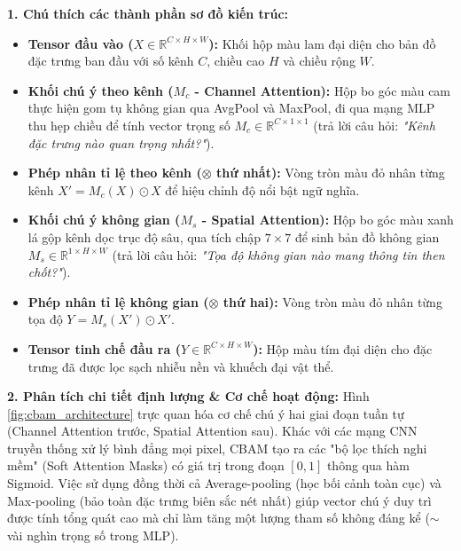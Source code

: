 \documentclass[12pt,a4paper]{article}
\begin{document}
\begin{chartbox}[title={Chú thích \& Phân tích chuyên sâu Sơ đồ khối chú ý CBAM (Hình \ref{fig:cbam_architecture})}]
\textbf{\color{blue!80!black}1. Chú thích các thành phần sơ đồ kiến trúc:}
\begin{itemize}[noitemsep,topsep=1pt,leftmargin=15pt]
    \item \textbf{Tensor đầu vào ($X \in \mathbb{R}^{C \times H \times W}$):} Khối hộp màu lam đại diện cho bản đồ đặc trưng ban đầu với số kênh $C$, chiều cao $H$ và chiều rộng $W$.
    \item \textbf{Khối chú ý theo kênh ($M_c$ - Channel Attention):} Hộp bo góc màu cam thực hiện gom tụ không gian qua AvgPool và MaxPool, đi qua mạng MLP thu hẹp chiều để tính vector trọng số $M_c \in \mathbb{R}^{C \times 1 \times 1}$ (trả lời câu hỏi: \textit{"Kênh đặc trưng nào quan trọng nhất?"}).
    \item \textbf{Phép nhân tỉ lệ theo kênh ($\otimes$ thứ nhất):} Vòng tròn màu đỏ nhân từng kênh $X' = M_c(X) \odot X$ để hiệu chỉnh độ nổi bật ngữ nghĩa.
    \item \textbf{Khối chú ý không gian ($M_s$ - Spatial Attention):} Hộp bo góc màu xanh lá gộp kênh dọc trục độ sâu, qua tích chập $7 \times 7$ để sinh bản đồ không gian $M_s \in \mathbb{R}^{1 \times H \times W}$ (trả lời câu hỏi: \textit{"Tọa độ không gian nào mang thông tin then chốt?"}).
    \item \textbf{Phép nhân tỉ lệ không gian ($\otimes$ thứ hai):} Vòng tròn màu đỏ nhân từng tọa độ $Y = M_s(X') \odot X'$.
    \item \textbf{Tensor tinh chế đầu ra ($Y \in \mathbb{R}^{C \times H \times W}$):} Hộp màu tím đại diện cho đặc trưng đã được lọc sạch nhiễu nền và khuếch đại vật thể.
\end{itemize}

\vspace{1mm}
\textbf{\color{blue!80!black}2. Phân tích chi tiết định lượng \& Cơ chế hoạt động:}
Hình \ref{fig:cbam_architecture} trực quan hóa cơ chế chú ý hai giai đoạn tuần tự (Channel Attention trước, Spatial Attention sau). Khác với các mạng CNN truyền thống xử lý bình đẳng mọi pixel, CBAM tạo ra các "bộ lọc thích nghi mềm" (Soft Attention Masks) có giá trị trong đoạn $[0, 1]$ thông qua hàm Sigmoid. Việc sử dụng đồng thời cả Average-pooling (học bối cảnh toàn cục) và Max-pooling (bảo toàn đặc trưng biên sắc nét nhất) giúp vector chú ý duy trì được tính tổng quát cao mà chỉ làm tăng một lượng tham số không đáng kể ($\sim$ vài nghìn trọng số trong MLP).


\end{chartbox}
\end{document}
